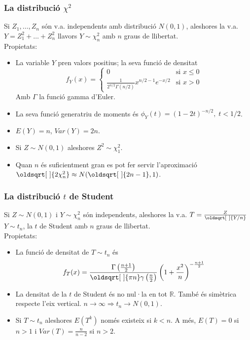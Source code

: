 \documentclass[a4paper]{sciposter}
\renewcommand*{\sqrt}[2][\ ]{\oldsqrt[#1]{#2} }
\begin{document}
\begin{multicols}{3}
\subsubsection{La distribució $\chi^2$}
Si $Z_1,\dots,Z_n$ són v.a. independents amb distribució $N(0,1)$, aleshores la v.a. $Y = Z_1^2 + \dots + Z_n^2$ llavors $Y \sim \chi^2_n$ amb $n$ graus de llibertat.\\
Propietats:
\begin{itemize}
	\item La variable $Y$ pren valors positius; la seva funció de densitat
	\begin{displaymath}
		f_Y(x) =
		\begin{cases}
			0 & \text{si } x \leq 0 \\
			\frac{1}{2^{n/2}\Gamma(n/2)}x^{n/2-1}e^{-x/2} & \text{si } x > 0
		\end{cases}
	\end{displaymath}
	Amb $\Gamma$ la funció gamma d'Euler.
	\item La seva funció generatriu de moments és $\phi_Y(t) = (1-2t)^{-n/2},\;t<1/2$.
	\item $E(Y) = n$, $Var(Y) = 2n$.
    \item Si $Z \sim N(0,1)$ aleshores $Z^2 \sim \chi^2_1$.
    \item Quan $n$ és suficientment gran es pot fer servir l'aproximació $\sqrt{2\chi^2_n} \approx N(\sqrt{2n-1}, 1)$.
\end{itemize}
\subsubsection{La distribució $t$ de Student}
Si $Z \sim N(0,1)$ i $Y \sim \chi^2_n$ són independents, aleshores la v.a. $T = \frac{Z}{\sqrt{Y/n}}$ $Y \sim t_n$, la $t$ de Student amb $n$ graus de llibertat.\\
Propietats:
\begin{itemize}
	\item La funció de densitat de $T \sim t_n$ és
	\begin{displaymath}
		f_T(x) = \frac{\Gamma\left(\frac{n+1}{2}\right)}{\sqrt{\pi n}\gamma\left(\frac{n}{2}\right)}\left(1+\frac{x^2}{n}\right)^{-\frac{n+1}{2}}
	\end{displaymath}
	\item La densitat de la $t$ de Student és no nul·la en tot $\mathbb{R}$. També és simètrica respecte l'eix vertical. $n \to \infty \Rightarrow t_n \to N(0,1)$.
	\item Si $T \sim t_n$ aleshores $E(T^k)$ només existeix si $k < n$. A més, $E(T) = 0$ si $n > 1$ i $Var(T) = \frac{n}{n-2}$ si $n>2$.
\end{itemize}

\end{multicols}
\end{document}
